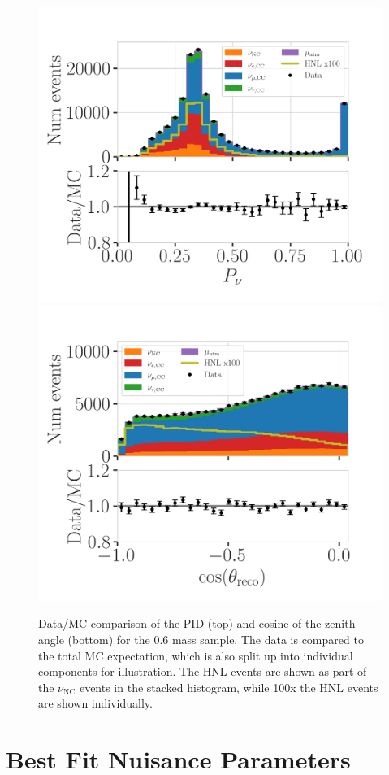 \begin{figure}[h]
    \includegraphics[width=0.49\linewidth]{figures/results/best_fit/pid_data_mc_agreement.png}
    \includegraphics[width=0.49\linewidth]{figures/results/best_fit/reco_coszen_data_mc_agreement.png}
	\caption[PID and cosine of the zenith angle data/MC comparison]{Data/MC comparison of the PID (top) and cosine of the zenith angle (bottom) for the \SI{0.6}{\gev} mass sample. The data is compared to the total MC expectation, which is also split up into individual components for illustration. The HNL events are shown as part of the $\nu_\mathrm{NC}$ events in the stacked histogram, while 100x the HNL events are shown individually.}
\end{figure}


\section{Best Fit Nuisance Parameters}

